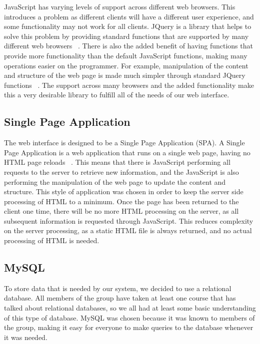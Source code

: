\documentclass[12pt]{report}
\let\Oldsubsection\subsection
\renewcommand{\subsection}{\FloatBarrier\Oldsubsection}
\begin{document}
JavaScript has varying levels of support across different web browsers. This introduces a problem as
different clients will have a different user experience, and some functionality may not work for
all clients. JQuery is a library that helps to solve this problem by providing standard functions that
are supported by many different web browsers ~\autocite{JQUERYSUPPORT}. There is also the added benefit
of having functions that
provide more functionality than the default JavaScript functions, making many operations easier on the
programmer. For example, manipulation of the content and structure of the web page is made much simpler through
standard JQuery functions ~\autocite{JQUERYREF}. The support across many browsers and the added functionality make this a
very desirable library to fulfill all of the needs of our web interface.

\subsection{Single Page Application} \label{single-page-application}

The web interface is designed to be a Single Page Application (SPA). A Single Page Application is
a web application that runs on a single web page, having no HTML page reloads ~\autocite{SPAREF}. This means
that there is JavaScript performing all requests to the server to retrieve new information, and the
JavaScript is also performing the manipulation of the web page to update the content and structure.
This style of application was chosen in order to keep the server side processing of HTML to a minimum.
Once the page has been returned to the client one time, there will be no more HTML processing on the
server, as all subsequent information is requested through JavaScript. This reduces complexity on the
server processing, as a static HTML file is always returned, and no actual processing of HTML is needed.

\subsection{MySQL} \label{mysql}

To store data that is needed by our system, we decided to use a relational database. All
members of the group have taken at least one course that has talked about relational databases, so
we all had at least some basic understanding of this type of database. MySQL was chosen
because it was known to members of the group, making it easy for everyone to make queries to
the database whenever it was needed.
\end{document}
